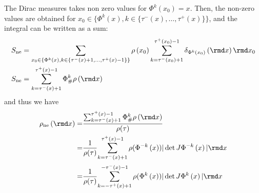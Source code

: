 The Dirac measures takes non zero values for $\Phi^k(x_0)=x$. Then, the non-zero values are obtained for $x_0 \in \{\Phi^k(x), k \in \{\tau^{-}\left(x\right), \dots, \tau^{+}\left(x\right)\}\}$, and the integral can be written as a sum:
\begin{align*}
    S_{\mathrm{ne}}&=\sum_{x_0 \in \{\Phi^k(x), k \in \{\tau^{-}\left(x\right)+1, \dots, \tau^{+}\left(x\right)-1\}\}}\rho\left(x_{0}\right)\sum_{k=\tau^{-}\left(x_{0}\right)+1}^{\tau^{+}\left(x_{0}\right)-1}\delta_{\Phi^{k}(x_{0})}\left(\rmd x\right)\rmd x_0 \\
    S_{\mathrm{ne}}&= \sum_{k=\tau^{-}\left(x\right)+1}^{\tau^{+}\left(x\right)-1}\Phi_{\#}^{k}\rho\left(\rmd x\right)
\end{align*}
and thus we have 
\begin{alignat*}{1}
\rho_{\mathrm{ne}}\left(\rmd x\right)= & \frac{\sum_{k=\tau^{-}\left(x\right)+1}^{\tau^{+}\left(x\right)-1}\Phi_{\#}^{k}\rho\left(\rmd x\right)}{\rho(\tau)}\\
= & \frac{1}{\rho(\tau)}{\sum_{k=\tau^{-}\left(x\right)+1}^{\tau^{+}\left(x\right)-1}\rho(\Phi^{-k}\left(x\right))|\det J\Phi^{-k}\left(x\right)|\rmd x}\\
= & \frac{1}{\rho(\tau)}{\sum_{k=-\tau^{+}\left(x\right)+1}^{-\tau^{-}\left(x\right)-1}\rho(\Phi^{k}\left(x\right))|\det J\Phi^{k}\left(x\right)|\rmd x}
\end{alignat*}

